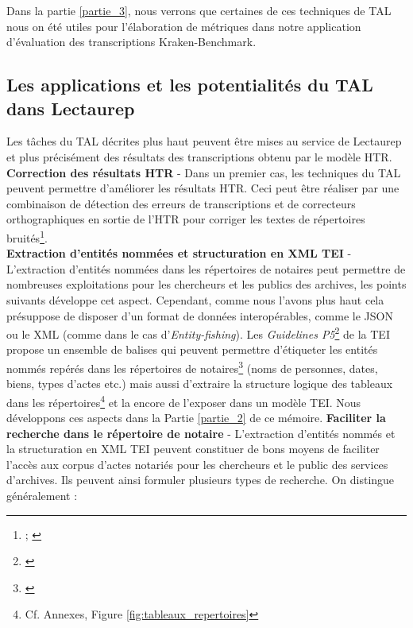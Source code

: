Dans la partie \ref{partie_3}, nous verrons que certaines de ces techniques de TAL nous on été utiles pour l'élaboration de métriques dans notre application d'évaluation des transcriptions Kraken-Benchmark.

\subsection{Les applications et les potentialités du TAL dans Lectaurep}\label{potentialités_TAL}  

Les tâches du TAL décrites plus haut peuvent être mises au service de Lectaurep et plus précisément des résultats des transcriptions obtenu par le modèle HTR.\\

\textbf{Correction des résultats HTR} - Dans un premier cas, les techniques du TAL peuvent permettre d'améliorer les résultats HTR. Ceci peut être réaliser par une combinaison de détection des erreurs de transcriptions et de correcteurs orthographiques en sortie de l'HTR pour corriger les textes de répertoires bruités\footnote{\cite{baranes_vers_2012};  \cite{magallon_detection_2018}}.\\

\textbf{Extraction d'entités nommées et structuration en XML TEI} - L'extraction d'entités nommées dans les répertoires de notaires peut permettre de nombreuses exploitations pour les chercheurs et les publics des archives, les points suivants développe cet aspect. Cependant, comme nous l'avons plus haut cela présuppose de disposer d'un format de données interopérables, comme le JSON ou le XML (comme dans le cas d'\textit{Entity-fishing}). Les \textit{Guidelines P5}\footnote{\cite{tei_consortium_p5_2020}} de la TEI propose un ensemble de balises qui peuvent permettre d'étiqueter les entités nommés repérés dans les répertoires de notaires\footnote{\cite{ruiz_concept-based_2017}} (noms de personnes, dates, biens, types d'actes etc.) mais aussi d'extraire la structure logique des tableaux dans les répertoires\footnote{Cf. Annexes, Figure \ref{fig:tableaux_repertoires}} et la encore de l'exposer dans un modèle TEI. Nous développons ces aspects dans la Partie \ref{partie_2} de ce mémoire.
\newpage
\textbf{Faciliter la recherche dans le répertoire de notaire} - L'extraction d'entités nommés et la structuration en XML TEI peuvent constituer de bons moyens de faciliter l'accès aux corpus d'actes notariés pour les chercheurs et le public des services d'archives. Ils peuvent ainsi formuler plusieurs types de recherche. On distingue généralement : 

